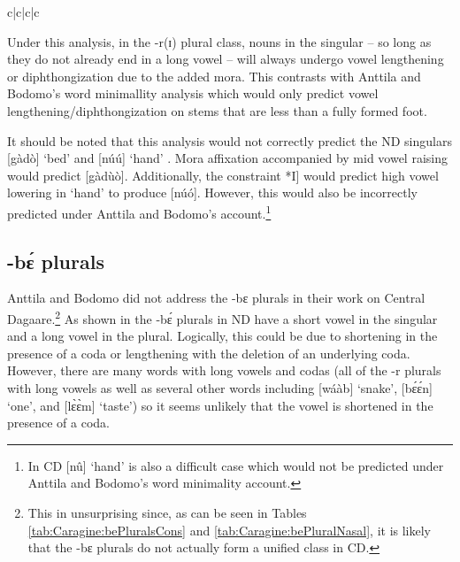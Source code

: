 \documentclass[output=paper,colorlinks,citecolor=brown,
]{langscibook}
\begin{document}
\begin{table}
  \caption{Tableau showing no lengthening of [daa] `stick' in ND}
  \label{tab:Caragine:morastick}
\begin{tableau}{c|c|c|c}
 \vio{*!} \vio{}
 \vio{} \vio{*}
\end{tableau}
\end{table}

Under this analysis, in the -r(ɪ) plural class, nouns in the singular -- so long as they do not already end in a long vowel -- will always undergo vowel lengthening or diphthongization due to the added mora. This contrasts with Anttila and Bodomo's word minimallity analysis which would only predict vowel lengthening/diphthongization on stems that are less than a fully formed foot.

It should be noted that this analysis would not correctly predict the ND singulars [gàdò] `bed' and [núú] `hand' . Mora affixation accompanied by mid vowel raising would predict [gàdùò]. Additionally, the constraint *I] would predict high vowel lowering in `hand' to produce [núó]. However, this would also be incorrectly predicted under Anttila and Bodomo's account.\footnote{In CD [nû] `hand' is also a difficult case which would not be predicted under Anttila and Bodomo's word minimality account.}

\subsection{-bɛ́ plurals} \label{sec:caragine:bepluralanalysis}

Anttila and Bodomo did not address the -bɛ plurals in their work on Central Dagaare.\footnote{This in unsurprising since, as can be seen in Tables \ref{tab:Caragine:bePluralsCons} and \ref{tab:Caragine:bePluralNasal}, it is likely that the -bɛ plurals do not actually form a unified class in CD.} As shown in  the -bɛ́ plurals in ND have a short vowel in the singular and a long vowel in the plural. Logically, this could be due to shortening in the presence of a coda or lengthening with the deletion of an underlying coda. However, there are many words with long vowels and codas (all of the -r plurals with long vowels as well as several other words including [wáàb] `snake', [bɛ́ɛ́n] `one', and [lɛ̀ɛ̀m] `taste') so it seems unlikely that the vowel is shortened in the presence of a coda.
\end{document}
